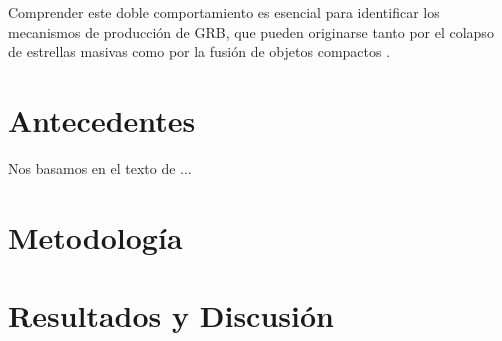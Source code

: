 \documentclass[final,5p,times,twocolumn,authoryear]{elsarticle}
\newcommand{\kms}{km\,s$^{-1}$}
\begin{document}
Comprender este doble comportamiento es esencial para identificar los mecanismos de producción de GRB, que pueden originarse tanto por el colapso de estrellas masivas como por la fusión de objetos compactos \citep{meszaros2006}.

\section{Antecedentes}
\label{antecedentes}
Nos basamos en el texto de \cite{ackermann2009}...



\section{Metodología}
\label{metodología}


\section{Resultados y Discusión}
\label{resultados}



\end{document}
